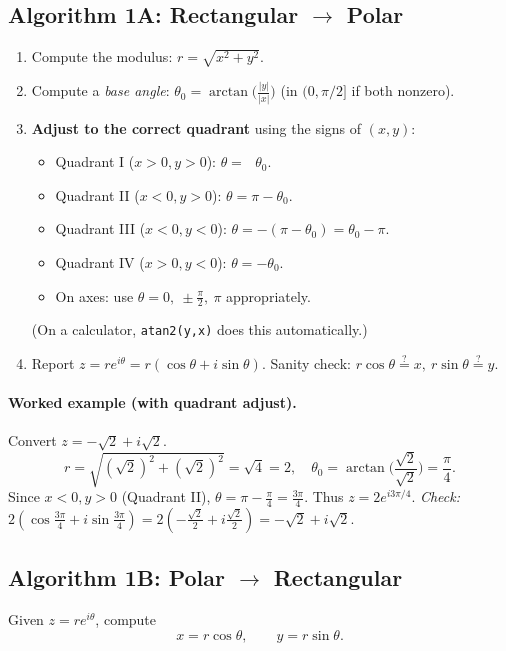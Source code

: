 \documentclass[11pt]{article}
\begin{document}
\subsection*{Algorithm 1A: Rectangular \(\to\) Polar}
\begin{enumerate}[label=\textbf{Step \arabic*.}]
  \item Compute the modulus: \(r=\sqrt{x^2+y^2}\).
  \item Compute a \emph{base angle}: \(\theta_0=\arctan\!\bigl(\tfrac{|y|}{|x|}\bigr)\) (in \((0,\pi/2]\) if both nonzero).
  \item \textbf{Adjust to the correct quadrant} using the signs of \((x,y)\):
  \begin{itemize}
     \item Quadrant I (\(x>0,y>0\)): \(\theta=\ \ \ \theta_0\).
     \item Quadrant II (\(x<0,y>0\)): \(\theta=\pi-\theta_0\).
     \item Quadrant III (\(x<0,y<0\)): \(\theta=-(\pi-\theta_0)=\theta_0-\pi\).
     \item Quadrant IV (\(x>0,y<0\)): \(\theta=-\theta_0\).
     \item On axes: use \(\theta=0,\ \pm \tfrac{\pi}{2},\ \pi\) appropriately.
  \end{itemize}
  (On a calculator, \texttt{atan2(y,x)} does this automatically.)
  \item Report \(z=re^{i\theta}=r(\cos\theta+i\sin\theta)\). Sanity check: \(r\cos\theta\stackrel{?}{=}x,\ r\sin\theta\stackrel{?}{=}y\).
\end{enumerate}

\paragraph{Worked example (with quadrant adjust).}
Convert \(z=-\sqrt{2}+i\sqrt{2}\).
\[
r=\sqrt{(\sqrt{2})^2+(\sqrt{2})^2}=\sqrt{4}=2,\quad
\theta_0=\arctan\!\Big(\frac{\sqrt{2}}{\sqrt{2}}\Big)=\frac{\pi}{4}.
\]
Since \(x<0,y>0\) (Quadrant II), \(\theta=\pi-\frac{\pi}{4}=\frac{3\pi}{4}\).
Thus \(z=2e^{i3\pi/4}\).
\emph{Check:} \(2(\cos\frac{3\pi}{4}+i\sin\frac{3\pi}{4})=2(-\frac{\sqrt2}{2}+i\frac{\sqrt2}{2})=-\sqrt2+i\sqrt2\).

\subsection*{Algorithm 1B: Polar \(\to\) Rectangular}
Given \(z=re^{i\theta}\), compute
\[
x=r\cos\theta,\qquad y=r\sin\theta.
\]
\end{document}
